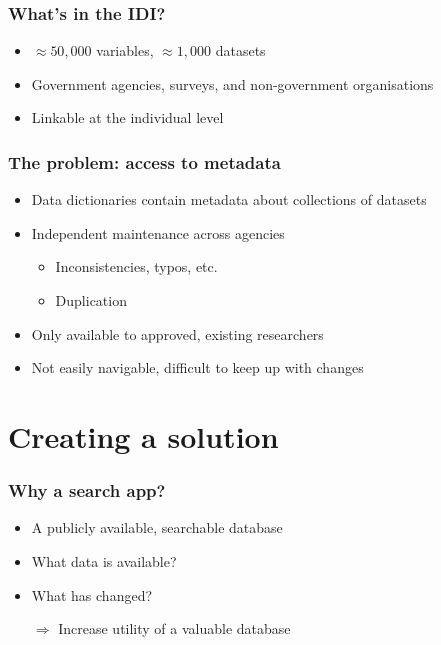 \documentclass[aspectratio=169]{beamer}
\begin{document}
\begin{frame}
    \frametitle{What's in the IDI?}

    \begin{itemize}
        \item $\approx{}50,000$ variables, $\approx{}1,000$ datasets
        \item Government agencies, surveys, and non-government organisations
        \item Linkable at the individual level
    \end{itemize}

\end{frame}


\begin{frame}
    \frametitle{The problem: access to metadata}

    \begin{itemize}
        \item Data dictionaries contain metadata about collections of datasets
        \item Independent maintenance across agencies
        \begin{itemize}
            \item Inconsistencies, typos, etc.
            \item Duplication
        \end{itemize}
        \item Only available to approved, existing researchers
        \item Not easily navigable, difficult to keep up with changes
    \end{itemize}
\end{frame}

\section{Creating a solution}

\begin{frame}
    \frametitle{Why a search app?}

    \begin{itemize}
        \item A publicly available, searchable database
        \item What data is available?
        \item What has changed?\\[2em]

        \item[$\Rightarrow$] Increase utility of a valuable database
    \end{itemize}
\end{frame}
\end{document}
